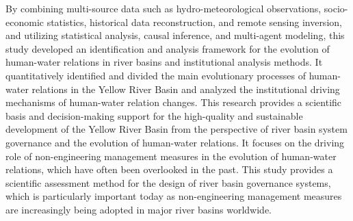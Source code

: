 \begin{eabstract}
  By combining multi-source data such as hydro-meteorological observations, socio-economic statistics, historical data reconstruction, and remote sensing inversion, and utilizing statistical analysis, causal inference, and multi-agent modeling, this study developed an identification and analysis framework for the evolution of human-water relations in river basins and institutional analysis methods. It quantitatively identified and divided the main evolutionary processes of human-water relations in the Yellow River Basin and analyzed the institutional driving mechanisms of human-water relation changes.
  This research provides a scientific basis and decision-making support for the high-quality and sustainable development of the Yellow River Basin from the perspective of river basin system governance and the evolution of human-water relations. It focuses on the driving role of non-engineering management measures in the evolution of human-water relations, which have often been overlooked in the past. This study provides a scientific assessment method for the design of river basin governance systems, which is particularly important today as non-engineering management measures are increasingly being adopted in major river basins worldwide.
\end{eabstract}


